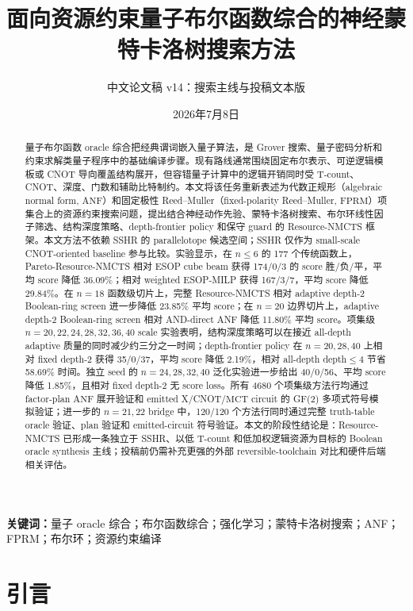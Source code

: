 \documentclass[UTF8,fontset=macnew,11pt]{ctexart}
\title{面向资源约束量子布尔函数综合的神经蒙特卡洛树搜索方法}
\author{中文论文稿 v14：搜索主线与投稿文本版}
\date{2026年7月8日}
\newcommand{\method}{Resource-NMCTS}
\newcommand{\screen}{Boolean-ring screen}
\newcommand{\anf}{\ensuremath{\mathrm{ANF}}}
\newcommand{\fprm}{\ensuremath{\mathrm{FPRM}}}
\newcommand{\ttable}{truth-table}
\newcommand{\mct}{\ensuremath{\mathrm{MCT}}}
\begin{document}
\pagestyle{plain}
\maketitle

\begin{abstract}
量子布尔函数 oracle 综合把经典谓词嵌入量子算法，是 Grover 搜索、量子密码分析和约束求解类量子程序中的基础编译步骤。现有路线通常围绕固定布尔表示、可逆逻辑模板或 CNOT 导向覆盖结构展开，但容错量子计算中的逻辑开销同时受 T-count、CNOT、深度、门数和辅助比特制约。本文将该任务重新表述为代数正规形（algebraic normal form, \anf{}）和固定极性 Reed--Muller（fixed-polarity Reed--Muller, \fprm{}）项集合上的资源约束搜索问题，提出结合神经动作先验、蒙特卡洛树搜索、布尔环线性因子筛选、结构深度策略、depth-frontier policy 和保守 guard 的 \method{} 框架。本文方法不依赖 SSHR 的 parallelotope 候选空间；SSHR 仅作为 small-scale CNOT-oriented baseline 参与比较。实验显示，在 $n\leq6$ 的 177 个传统函数上，Pareto-\method{} 相对 ESOP cube beam 获得 174/0/3 的 score 胜/负/平，平均 score 降低 36.09\%；相对 weighted ESOP-MILP 获得 167/3/7，平均 score 降低 29.84\%。在 $n=18$ 函数级切片上，完整 \method{} 相对 adaptive depth-2 \screen{} 进一步降低 23.85\% 平均 score；在 $n=20$ 边界切片上，adaptive depth-2 \screen{} 相对 AND-direct ANF 降低 11.80\% 平均 score。项集级 $n=20,22,24,28,32,36,40$ scale 实验表明，结构深度策略可以在接近 all-depth adaptive 质量的同时减少约三分之一时间；depth-frontier policy 在 $n=20,28,40$ 上相对 fixed depth-2 获得 35/0/37，平均 score 降低 2.19\%，相对 all-depth depth$\leq4$ 节省 58.69\% 时间。独立 seed 的 $n=24,28,32,40$ 泛化实验进一步给出 40/0/56、平均 score 降低 1.85\%，且相对 fixed depth-2 无 score loss。所有 4680 个项集级方法行均通过 factor-plan \anf{} 展开验证和 emitted X/CNOT/\mct{} circuit 的 GF(2) 多项式符号模拟验证；进一步的 $n=21,22$ bridge 中，120/120 个方法行同时通过完整 \ttable{} oracle 验证、plan 验证和 emitted-circuit 符号验证。本文的阶段性结论是：\method{} 已形成一条独立于 SSHR、以低 T-count 和低加权逻辑资源为目标的 Boolean oracle synthesis 主线；投稿前仍需补充更强的外部 reversible-toolchain 对比和硬件后端相关评估。
\end{abstract}

\noindent\textbf{关键词：}量子 oracle 综合；布尔函数综合；强化学习；蒙特卡洛树搜索；ANF；FPRM；布尔环；资源约束编译

\section{引言}
\end{document}
